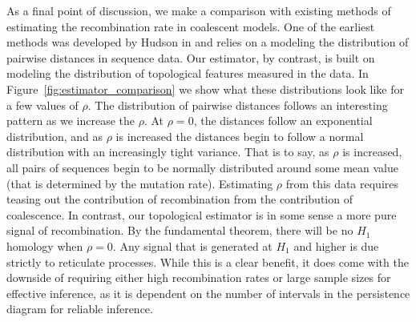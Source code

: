 As a final point of discussion, we make a comparison with existing methods of estimating the recombination rate in coalescent models.
One of the earliest methods was developed by Hudson in \cite{Hudson:1987fo} and relies on a modeling the distribution of pairwise distances in sequence data.
Our estimator, by contrast, is built on modeling the distribution of topological features measured in the data.
In Figure~\ref{fig:estimator_comparison} we show what these distributions look like for a few values of $\rho$.
The distribution of pairwise distances follows an interesting pattern as we increase the $\rho$.
At $\rho=0$, the distances follow an exponential distribution, and as $\rho$ is increased the distances begin to follow a normal distribution with an increasingly tight variance.
That is to say, as $\rho$ is increased, all pairs of sequences begin to be normally distributed around some mean value (that is determined by the mutation rate).
Estimating $\rho$ from this data requires teasing out the contribution of recombination from the contribution of coalescence.
In contrast, our topological estimator is in some sense a more pure signal of recombination.
By the fundamental theorem, there will be no $H_1$ homology when $\rho=0$.
Any signal that is generated at $H_1$ and higher is due strictly to reticulate processes.
While this is a clear benefit, it does come with the downside of requiring either high recombination rates or large sample sizes for effective inference, as it is dependent on the number of intervals in the persistence diagram for reliable inference.

